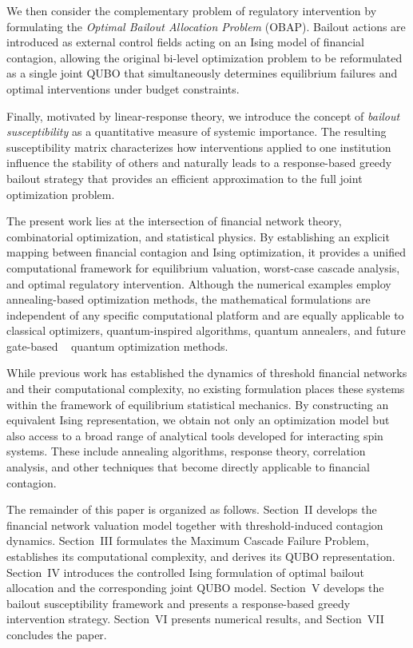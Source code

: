 \documentclass[aps,reprint,superscriptaddress,pra]{revtex4-2}
\begin{document}
We then consider the complementary problem of regulatory intervention by formulating the \emph{Optimal Bailout Allocation Problem} (OBAP). Bailout actions are introduced as external control fields acting on an Ising model of financial contagion, allowing the original bi-level optimization problem to be reformulated as a single joint QUBO that simultaneously determines equilibrium failures and optimal interventions under budget constraints.

Finally, motivated by linear-response theory, we introduce the concept of \emph{bailout susceptibility} as a quantitative measure of systemic importance. The resulting susceptibility matrix characterizes how interventions applied to one institution influence the stability of others and naturally leads to a response-based greedy bailout strategy that provides an efficient approximation to the full joint optimization problem.

The present work lies at the intersection of financial network theory, combinatorial optimization, and statistical physics. By establishing an explicit mapping between financial contagion and Ising optimization, it provides a unified computational framework for equilibrium valuation, worst-case cascade analysis, and optimal regulatory intervention. Although the numerical examples employ annealing-based optimization methods, the mathematical formulations are independent of any specific computational platform and are equally applicable to classical optimizers, quantum-inspired algorithms, quantum annealers, and future gate-based ~\cite{farhi2014qaoa} quantum optimization methods.

While previous work has established the dynamics of threshold financial networks and their computational complexity, no existing formulation places these systems within the framework of equilibrium statistical mechanics. By constructing an equivalent Ising representation, we obtain not only an optimization model but also access to a broad range of analytical tools developed for interacting spin systems. These include annealing algorithms, response theory, correlation analysis, and other techniques that become directly applicable to financial contagion.

The remainder of this paper is organized as follows. Section~II develops the financial network valuation model together with threshold-induced contagion dynamics. Section~III formulates the Maximum Cascade Failure Problem, establishes its computational complexity, and derives its QUBO representation. Section~IV introduces the controlled Ising formulation of optimal bailout allocation and the corresponding joint QUBO model. Section~V develops the bailout susceptibility framework and presents a response-based greedy intervention strategy. Section~VI presents numerical results, and Section~VII concludes the paper.
\end{document}
